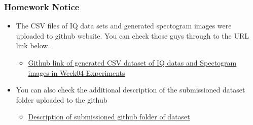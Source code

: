 \begin{mdframed}[backgroundcolor = gray!20] 
    \vspace{-5mm}
    \begin{center}
        \subsubsection*{\large Homework Notice}
            \vspace{-2mm}
            \begin{itemize}
                \item {\small The CSV files of IQ data sets and generated spectogram images were uploaded to
                github website. You can check those guys through to the URL link below.\\
                } \vspace{-2mm}
                \begin{itemize}
                    \item \href{https://github.com/Intern-yunshin-cho/Network-Lab-Week4-Results_Share}
            		{Github link of generated CSV dataset of IQ datas and Spectogram images in Week04 Experiments}
                    \end{itemize}
                \vspace{-4mm}
                \item {\small You can also check the additional description of the submissioned dataset folder uploaded to the github }
                \vspace{-2mm}
                \begin{itemize}
                    \item \href{https://acidic-duke-bb9.notion.site/Week-04-submissioned-data-description-4c73cb4d3c5c413994ddd17a0785c6e6}
            		{Description of submissioned github folder of dataset}
                \end{itemize}
            \end{itemize}
    \end{center}
\end{mdframed}
